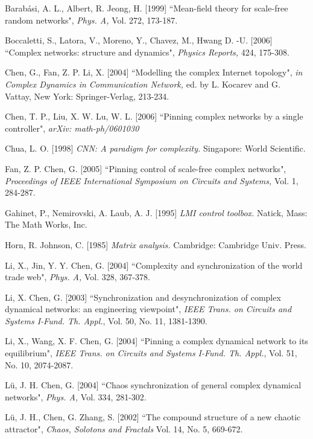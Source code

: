 \documentclass[11pt]{article}
\begin{document}
\begin{thebibliography}{10}

 { Barab\'{a}si, A. L., Albert, R.  Jeong, H. [1999] ``Mean-field theory for scale-free
random networks", {\it Phys. A,} Vol. 272, 173-187.}

 { Boccaletti, S., Latora, V., Moreno, Y., Chavez, M.,  Hwang D. -U. [2006]
``Complex networks: structure and dynamics",  {\it Physics Reports,}
424, 175-308.}

 { Chen, G., Fan, Z. P.  Li, X. [2004]  ``Modelling the complex Internet topology",
{\it in Complex Dynamics in Communication Network,} ed. by L.
Kocarev and G. Vattay, New York: Springer-Verlag, 213-234.}

 { Chen, T. P., Liu, X. W.   Lu, W. L. [2006]
``Pinning complex networks by a single controller", {\it arXiv:
math-ph/0601030}}

 { Chua, L. O. [1998] {\it CNN: A paradigm for complexity.}
\; Singapore: World Scientific.}

 { Fan, Z. P.  Chen, G. [2005]
``Pinning control of scale-free complex networks", {\it Proceedings
of IEEE International Symposium on Circuits and Systems,} Vol. 1,
284-287.}

 Gahinet, P., Nemirovski, A.  Laub, A. J. [1995] {\it LMI control toolbox.} \; Natick, Mass: The
Math Works, Inc.

 Horn, R.  Johnson, C. [1985] {\it Matrix analysis.} \;
Cambridge: Cambridge Univ. Press.

 { Li, X., Jin, Y. Y.   Chen, G. [2004]
``Complexity and synchronization of the world trade web", {\it Phys.
A,} Vol. 328, 367-378.}

 { Li, X.   Chen, G. [2003]
``Synchronization and desynchronization of complex dynamical
networks: an engineering viewpoint", {\it IEEE Trans. on Circuits
and Systems I-Fund. Th. Appl.}, Vol. 50, No. 11, 1381-1390.}

 { Li, X., Wang, X. F.   Chen, G. [2004]
``Pinning a complex dynamical network to its equilibrium", {\it IEEE
Trans. on Circuits and Systems I-Fund. Th. Appl.}, Vol. 51, No. 10,
2074-2087.}

 { L\"{u}, J. H.  Chen, G. [2004] ``Chaos synchronization of general complex dynamical
networks",  {\it Phys. A,} Vol. 334, 281-302.}

 { L\"{u}, J. H., Chen, G.  Zhang, S. [2002] ``The compound structure of a
new chaotic attractor",  {\it Chaos, Solotons and Fractals} Vol. 14,
No. 5, 669-672.}


\end{thebibliography}
\end{document}
